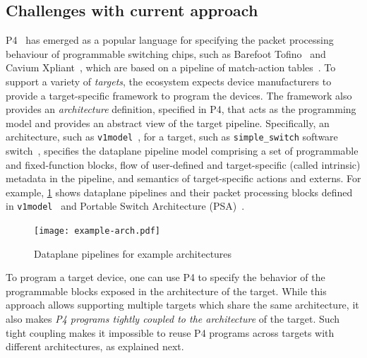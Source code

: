 \documentclass[letterpaper,twocolumn,10pt]{article}
\begin{document}
\subsection{Challenges with current approach}
\label{sec:challenges}

P4~\cite{bosshart2014p4} has emerged as a popular language for
specifying the packet processing behaviour of programmable switching
chips, such as Barefoot Tofino~\cite{tofino} and Cavium
Xpliant~\cite{xpliant}, which are based on a pipeline of match-action
tables~\cite{bosshart2013forwarding}. To support a variety of
\emph{targets}, the ecosystem expects device manufacturers to provide a
target-specific framework to program the devices. The framework also
provides an \emph{architecture} definition, specified in P4, that acts
as the programming model and provides an abstract view of the target
pipeline. Specifically, an architecture, such as
\texttt{v1model}~\cite{v1model.p4}, for a target, such as
\texttt{simple\_switch} software switch~\cite{simple_switch.md},
specifies the dataplane pipeline model comprising a set of
programmable and fixed-function blocks, flow of user-defined and
target-specific (called intrinsic) metadata in the pipeline, and
semantics of target-specific actions and externs. For example,
\cref{fig:arch-example} shows dataplane pipelines and their packet
processing blocks defined in \texttt{v1model}~\cite{simple_switch.md}
and Portable Switch Architecture (PSA)~\cite{psa}.
\begin{figure}[tb]
  \centering
  \texttt{[image: example-arch.pdf]}
  \caption{Dataplane pipelines for example architectures}
  \label{fig:arch-example}
\end{figure}

To program a target device, one can use P4 to specify the behavior of
the programmable blocks exposed in the architecture of the target.
While this approach allows supporting multiple targets which share the
same architecture, it also makes \emph{P4 programs tightly coupled to
the architecture} of the target. Such tight coupling makes it
impossible to reuse P4 programs across targets with different
architectures, as explained next.



\end{document}
